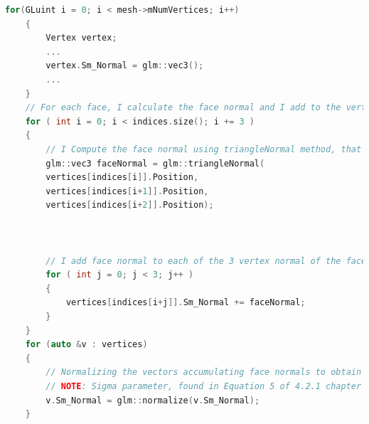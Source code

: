 \begin{lstlisting}[language=C++, caption=Smoothed normal computations added in processMesh method,label={code:smoothing_model}]
	for(GLuint i = 0; i < mesh->mNumVertices; i++)
	{
		Vertex vertex;
		...
		vertex.Sm_Normal = glm::vec3();
		...
	}
	// For each face, I calculate the face normal and I add to the vertices' normal used by the face. Finally, I normalize the normal to obtain the smoothed surface normal.
	for ( int i = 0; i < indices.size(); i += 3 )
	{
		// I Compute the face normal using triangleNormal method, that computes normal starting from triangle points
		glm::vec3 faceNormal = glm::triangleNormal(
		vertices[indices[i]].Position,
		vertices[indices[i+1]].Position,
		vertices[indices[i+2]].Position);
		
		
		
		// I add face normal to each of the 3 vertex normal of the face
		for ( int j = 0; j < 3; j++ )
		{
			vertices[indices[i+j]].Sm_Normal += faceNormal;
		}
	}
	for (auto &v : vertices)
	{
		// Normalizing the vectors accumulating face normals to obtain the smoothed surface normal
		// NOTE: Sigma parameter, found in Equation 5 of 4.2.1 chapter of the reference paper ( to control the quantity of convolution kernel used ) is implicitely 1.
		v.Sm_Normal = glm::normalize(v.Sm_Normal);
	}	
\end{lstlisting}
